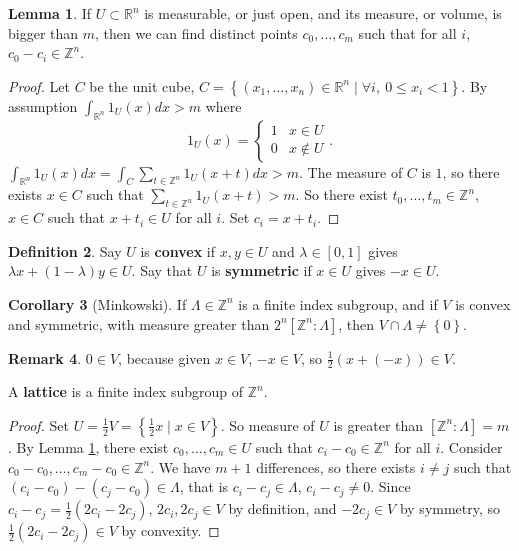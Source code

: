 \documentclass{article}
\newcommand{\Z}{\mathbb{Z}}
\newcommand{\R}{\mathbb{R}}
\newcommand{\rb}[1]{\left( #1 \right)}
\renewcommand{\sb}[1]{\left[ #1 \right]}
\newcommand{\cb}[1]{\left\{ #1 \right\}}
\theoremstyle{definition}\newtheorem{definition}{Definition}[section]
\theoremstyle{definition}\newtheorem{remark}[definition]{Remark}
\theoremstyle{definition}\newtheorem*{example}{Example}
\theoremstyle{definition}\newtheorem*{note}{Note}
\newtheorem{lemma}[definition]{Lemma}
\newtheorem{corollary}[definition]{Corollary}
\begin{document}
\begin{lemma}
\label{lem:4.1}
If $ U \subset \R^n $ is measurable, or just open, and its measure, or volume, is bigger than $ m $, then we can find distinct points $ c_0, \dots, c_m $ such that for all $ i $, $ c_0 - c_i \in \Z^n $.
\end{lemma}

\begin{proof}
Let $ C $ be the unit cube, $ C = \cb{\rb{x_1, \dots, x_n} \in \R^n \mid \forall i, \ 0 \le x_i < 1} $. By assumption $ \int_{\R^n} 1_U\rb{x} dx > m $ where
$$ 1_U\rb{x} = \begin{cases} 1 & x \in U \\ 0 & x \notin U \end{cases}. $$
$ \int_{\R^n} 1_U\rb{x} dx = \int_C \sum_{t \in \Z^n} 1_U\rb{x + t}dx > m $. The measure of $ C $ is $ 1 $, so there exists $ x \in C $ such that $ \sum_{t \in \Z^n} 1_U\rb{x + t} > m $. So there exist $ t_0, \dots, t_m \in \Z^n $, $ x \in C $ such that $ x + t_i \in U $ for all $ i $. Set $ c_i = x + t_i $.
\end{proof}

\begin{definition}
Say $ U $ is \textbf{convex} if $ x, y \in U $ and $ \lambda \in \sb{0, 1} $ gives $ \lambda x + \rb{1 - \lambda}y \in U $. Say that $ U $ is \textbf{symmetric} if $ x \in U $ gives $ -x \in U $.
\end{definition}

\begin{corollary}[Minkowski]
\label{cor:4.3}
If $ \Lambda \in \Z^n $ is a finite index subgroup, and if $ V $ is convex and symmetric, with measure greater than $ 2^n\sb{\Z^n : \Lambda} $, then $ V \cap \Lambda \ne \cb{0} $.
\end{corollary}

\begin{remark}
$ 0 \in V $, because given $ x \in V $, $ -x \in V $, so $ \tfrac{1}{2}\rb{x + \rb{-x}} \in V $.
\end{remark}

A \textbf{lattice} is a finite index subgroup of $ \Z^n $.

\begin{proof}
Set $ U = \tfrac{1}{2}V = \cb{\tfrac{1}{2}x \mid x \in V} $. So measure of $ U $ is greater than $ \sb{\Z^n : \Lambda} = m $. By Lemma \ref{lem:4.1}, there exist $ c_0, \dots, c_m \in U $ such that $ c_i - c_0 \in \Z^n $ for all $ i $. Consider $ c_0 - c_0, \dots, c_m - c_0 \in \Z^n $. We have $ m + 1 $ differences, so there exists $ i \ne j $ such that $ \rb{c_i - c_0} - \rb{c_j - c_0} \in \Lambda $, that is $ c_i - c_j \in \Lambda $, $ c_i - c_j \ne 0 $. Since $ c_i - c_j = \tfrac{1}{2}\rb{2c_i - 2c_j} $, $ 2c_i, 2c_j \in V $ by definition, and $ -2c_j \in V $ by symmetry, so $ \tfrac{1}{2}\rb{2c_i - 2c_j} \in V $ by convexity.
\end{proof}
\end{document}
